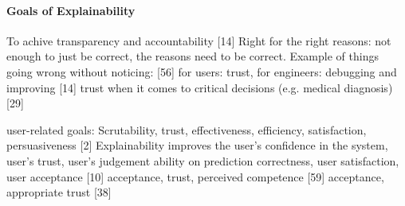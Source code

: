 \paragraph{Goals of Explainability}
To achive transparency and accountability [14] \newline
Right for the right reasons: not enough to just be correct, the reasons need to be correct. Example of things going wrong without noticing: [56] \newline
for users: trust, for engineers: debugging and improving [14]\newline
trust when it comes to critical decisions (e.g. medical diagnosis) [29] \newline

user-related goals: \newline
Scrutability, trust, effectiveness, efficiency, satisfaction, persuasiveness [2] \newline
Explainability improves the user's confidence in the system, user's trust, user's judgement ability on prediction correctness, user satisfaction, user acceptance [10] \newline
acceptance, trust, perceived competence [59] \newline
acceptance, appropriate trust [38] \newline

